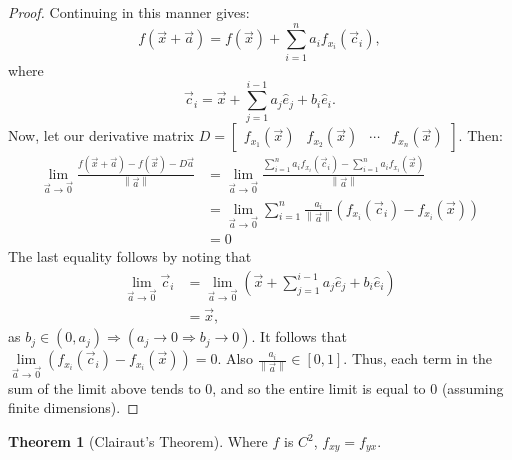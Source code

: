 \documentclass{article}
\theoremstyle{definition}
\newtheorem{thm}{Theorem}[subsubsection]
\begin{document}
\begin{proof}
	Continuing in this manner gives:
	\[f(\vec x+\vec a)=f(\vec x)+\sum_{i=1}^na_if_{x_i}(\vec c_i),\]
	where \[\vec c_i=\vec x+\sum_{j=1}^{i-1}a_j\hat{e}_j+b_i\hat{e}_i.\]
	Now, let our derivative matrix $D=\begin{bmatrix}f_{x_1}(\vec x)&f_{x_2}(\vec x)&\cdots&f_{x_n}(\vec x)\end{bmatrix}$. Then:
	\begin{align*}
		\lim\limits_{\vec a\rightarrow\vec0}\frac{f(\vec x+\vec a)-f(\vec x)-D\vec a}{\left\lVert\vec a\right\rVert}&=\lim\limits_{\vec a\rightarrow\vec0}\frac{\sum_{i=1}^na_if_{x_i}(\vec c_i)-\sum_{i=1}^na_if_{x_i}(\vec x)}{\left\lVert\vec a\right\rVert}\\
		&=\lim\limits_{\vec a\rightarrow\vec0}\sum_{i=1}^n\frac{a_i}{\left\lVert\vec a\right\rVert}\left(f_{x_i}(\vec c_i)-f_{x_i}(\vec x)\right)\\
		&=0
	\end{align*}
	The last equality follows by noting that
	\begin{align*}
		\lim\limits_{\vec a\rightarrow\vec0}\vec c_i&=\lim\limits_{\vec a\rightarrow\vec0}\left(\vec x+\sum_{j=1}^{i-1}a_j\hat{e}_j+b_i\hat{e}_i\right)\\
		&=\vec x,
	\end{align*}
	as $b_j\in(0,a_j)\Rightarrow (a_j\rightarrow0\Rightarrow b_j\rightarrow0)$. It follows that $\lim\limits_{\vec a\rightarrow\vec0}\left(f_{x_i}(\vec c_i)-f_{x_i}(\vec x)\right)=0$. Also $\frac{a_i}{\left\lVert\vec a\right\rVert}\in[0,1]$. Thus, each term in the sum of the limit above tends to 0, and so the entire limit is equal to 0 (assuming finite dimensions).
\end{proof}
\begin{thm}[Clairaut's Theorem]
	Where $f$ is $C^2$, $f_{xy}=f_{yx}$.
\end{thm}
\end{document}
